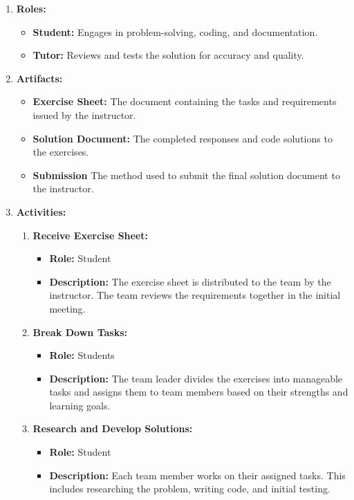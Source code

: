 \documentclass[a4paper]{scrartcl}
\begin{document}
\begin{enumerate}
  \item \textbf{Roles:}
  \begin{itemize}
      \item \textbf{Student:} Engages in problem-solving, coding, and documentation.
      \item \textbf{Tutor:} Reviews and tests the solution for accuracy and quality.
  \end{itemize}
  
  \item \textbf{Artifacts:}
  \begin{itemize}
      \item \textbf{Exercise Sheet:} The document containing the tasks and requirements issued by the instructor.
      \item \textbf{Solution Document:} The completed responses and code solutions to the exercises.
      \item \textbf{Submission} The method used to submit the final solution document to the instructor.
  \end{itemize}
  
  \item \textbf{Activities:}
  \begin{enumerate}
      \item \textbf{Receive Exercise Sheet:}
      \begin{itemize}
          \item \textbf{Role:} Student
          \item \textbf{Description:} The exercise sheet is distributed to the team by the instructor. The team reviews the requirements together in the initial meeting.
      \end{itemize}

      \item \textbf{Break Down Tasks:}
      \begin{itemize}
          \item \textbf{Role:} Students
          \item \textbf{Description:} The team leader divides the exercises into manageable tasks and assigns them to team members based on their strengths and learning goals.
      \end{itemize}

      \item \textbf{Research and Develop Solutions:}
      \begin{itemize}
          \item \textbf{Role:} Student
          \item \textbf{Description:} Each team member works on their assigned tasks. This includes researching the problem, writing code, and initial testing.
      \end{itemize}


\end{enumerate}
\end{enumerate}
\end{document}

